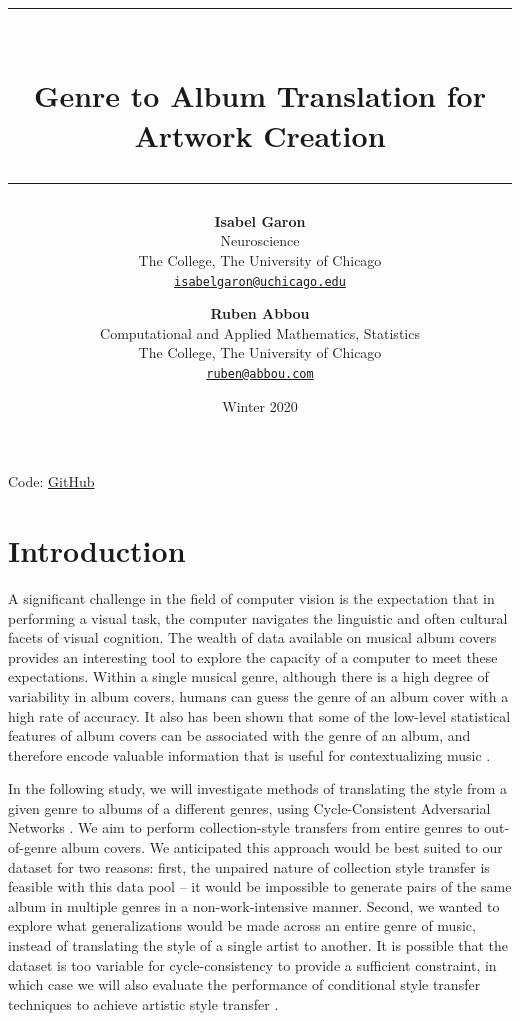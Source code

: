 \documentclass{article}
\title{\bf \Large \rule{\linewidth}{1pt}\\Genre to Album Translation for Artwork Creation
\\ \rule{\linewidth}{2pt}}
\author{\textbf{Isabel Garon}\\ Neuroscience \\ The College, The University of Chicago \\ \texttt{\href{mailto: isabelgaron@uchicago.edu}{isabelgaron@uchicago.edu}}\and
\textbf{Ruben Abbou} \\ Computational and Applied Mathematics, Statistics \\ The College, The University of Chicago \\
\texttt{\href{mailto: ruben@abbou.com}{ruben@abbou.com}}}
\date{Winter 2020}
\begin{document}
\maketitle
\thispagestyle{header}

\begin{center}
Code: \href{https://github.com/rabbou/GenreToAlbumArtworkTranslation}{GitHub}
\end{center}

\section{Introduction}

A significant challenge in the field of computer vision is the expectation that in performing a visual task, the computer navigates the linguistic and often cultural facets of visual cognition. The wealth of data available on musical album covers provides an interesting tool to explore the capacity of a computer to meet these expectations. Within a single musical genre, although there is a high degree of variability in album covers, humans can guess the genre of an album cover with a high rate of accuracy. It also has been shown that some of the low-level statistical features of album covers can be associated with the genre of an album, and therefore encode valuable information that is useful for contextualizing music \cite{5696720}.
\par In the following study, we will investigate methods of translating the style from a given genre to albums of a different genres, using Cycle-Consistent Adversarial Networks \cite{DBLP:journals/corr/ZhuPIE17}. We aim to perform collection-style transfers from entire genres to out-of-genre album covers. We anticipated this approach would be best suited to our dataset for two reasons: first, the unpaired nature of collection style transfer is feasible with this data pool – it would be impossible to generate pairs of the same album in multiple genres in a non-work-intensive manner. Second, we wanted to explore what generalizations would be made across an entire genre of music, instead of translating the style of a single artist to another.
It is possible that the dataset is too variable for cycle-consistency to provide a sufficient constraint, in which case we will also evaluate the performance of conditional style transfer techniques to achieve artistic style transfer \cite{DBLP:journals/corr/GatysEB15a}.
\end{document}

